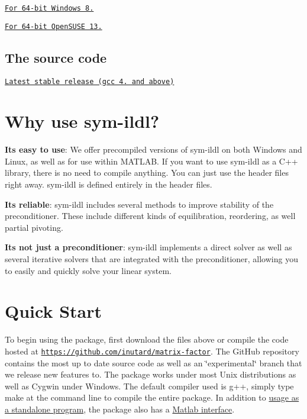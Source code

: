\begin{DoxyItemize}
\item \href{https://github.com/inutard/matrix-factor/raw/master/release/win64/ldl_driver.exe}{\tt For 64-\/bit Windows 8.}
\item \href{https://github.com/inutard/matrix-factor/raw/master/release/linux/ldl_driver}{\tt For 64-\/bit Open\+S\+U\+SE 13.} 
\end{DoxyItemize}\hypertarget{index_source_dlinks}{}\subsection{The source code}\label{index_source_dlinks}

\begin{DoxyItemize}
\item \href{https://github.com/inutard/matrix-factor/archive/master.zip}{\tt Latest stable release (gcc 4. and above)}
\end{DoxyItemize}\hypertarget{index_why_use}{}\section{Why use sym-\/ildl?}\label{index_why_use}

\begin{DoxyItemize}
\item {\bfseries It\textquotesingle{}s easy to use}\+: We offer precompiled versions of sym-\/ildl on both Windows and Linux, as well as for use within M\+A\+T\+L\+AB. If you want to use sym-\/ildl as a C++ library, there is no need to compile anything. You can just use the header files right away. sym-\/ildl is defined entirely in the header files.
\item {\bfseries It\textquotesingle{}s reliable}\+: sym-\/ildl includes several methods to improve stability of the preconditioner. These include different kinds of equilibration, reordering, as well partial pivoting.
\item {\bfseries It\textquotesingle{}s not just a preconditioner}\+: sym-\/ildl implements a direct solver as well as several iterative solvers that are integrated with the preconditioner, allowing you to easily and quickly solve your linear system.
\end{DoxyItemize}\hypertarget{index_quick_start}{}\section{Quick Start}\label{index_quick_start}
To begin using the package, first download the files above or compile the code hosted at \href{https://github.com/inutard/matrix-factor}{\tt https\+://github.\+com/inutard/matrix-\/factor}. The Git\+Hub repository contains the most up to date source code as well as an \char`\"{}experimental\char`\"{} branch that we release new features to. The package works under most Unix distributions as well as Cygwin under Windows. The default compiler used is {\ttfamily g++}, simply type {\ttfamily make} at the command line to compile the entire package. In addition to \hyperlink{index_ldl_driver}{usage as a standalone program}, the package also has a \hyperlink{index_matlab_mex}{Matlab interface}.

